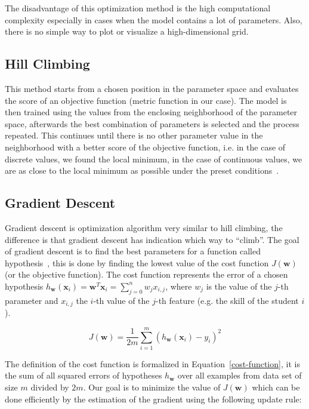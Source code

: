 The disadvantage of this optimization method is the high computational complexity especially in cases when the model contains a lot of parameters. Also, there is no simple way to plot or visualize a high-dimensional grid.

\subsection{Hill Climbing}
\label{hill-climbing}

This method starts from a chosen position in the parameter space and evaluates the score of an objective function (metric function in our case). The model is then trained using the values from the enclosing neighborhood of the parameter space, afterwards the best combination of parameters is selected and the process repeated. This continues until there is no other parameter value in the neighborhood with a better score of the objective function, i.e. in the case of discrete values, we found the local minimum, in the case of continuous values, we are as close to the local minimum as possible under the preset conditions~\cite{Russell2009}.

\subsection{Gradient Descent}
\label{gradient-descent}

Gradient descent is optimization algorithm very similar to hill climbing, the difference is that gradient descent has indication which way to ``climb''. The goal of gradient descent is to find the best parameters for a function called hypothesis~\cite{Klusasek2014}, this is done by finding the lowest value of the cost function $J(\mathbf{w})$ (or the objective function). The cost function represents the error of a chosen hypothesis $h_{\mathbf{w}}(\mathbf{x}_i) = \mathbf{w}^T \mathbf{x}_i = \sum^n_{j=0} w_j x_{i,j}$, where $w_j$ is the value of the $j$-th parameter and $x_{i,j}$ the $i$-th value of the $j$-th feature (e.g. the skill of the student $i$).

\begin{equation} \label{cost-function}
  J(\mathbf{w}) = \frac{1}{2m} \sum^m_{i=1} (h_{\mathbf{w}}(\mathbf{x}_i) - y_i)^2
\end{equation}

The definition of the cost function is formalized in Equation~\ref{cost-function}, it is the sum of all squared errors of hypotheses $h_{\mathbf{w}}$ over all examples from data set of size $m$ divided by $2m$. Our goal is to minimize the value of $J(\mathbf{w})$ which can be done efficiently by the estimation of the gradient using the following update rule:

